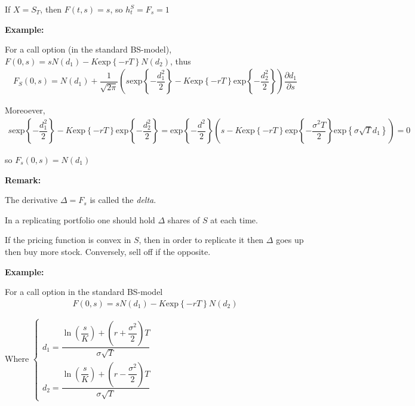 \noindent If $X = S_T$, then $F(t,s) = s$, so $h_t^S = F_s = 1$
\par\bigskip
\noindent\textbf{Example:}\par
\noindent For a call option (in the standard BS-model), $F(0,s) = sN(d_1) - K\text{exp}\left\{-rT\right\}N(d_2)$, thus
\begin{equation*}
  \begin{gathered}
    F_S(0,s) = N(d_1)+\dfrac{1}{\sqrt{2\pi}}\left(s\text{exp}\left\{-\dfrac{d_1^2}{2}\right\}-K\text{exp}\left\{-rT\right\}\text{exp}\left\{-\dfrac{d_2^2}{2}\right\}\right)\dfrac{\partial d_1}{\partial s}
  \end{gathered}
\end{equation*}
\par\bigskip
\noindent Moreoever, 
\begin{equation*}
  \begin{gathered}
    s\text{exp}\left\{-\dfrac{d_1^2}{2}\right\}-K\text{exp}\left\{-rT\right\}\text{exp}\left\{-\dfrac{d_2^2}{2}\right\} = \text{exp}\left\{-\dfrac{d^2}{2}\right\}\left(s-K\text{exp}\left\{-rT\right\}\text{exp}\left\{-\dfrac{\sigma^2T}{2}\right\}\text{exp}\left\{\sigma\sqrt{T}d_1\right\}\right) = 0
  \end{gathered}
\end{equation*}\par
\noindent so $F_s(0,s) = N(d_1)$
\par\bigskip
\noindent\textbf{Remark:}\par
\noindent The derivative $\Delta = F_s$ is called the \textit{delta}.\par
\noindent In a replicating portfolio one should hold $\Delta$ shares of $S$ at each time.
\par\bigskip
\noindent If the pricing function is convex in $S$, then in order to replicate it then $\Delta$ goes up then buy more stock. Conversely, sell off if the opposite.
\par\bigskip
\noindent\textbf{Example:}\par
\noindent For a call option in the standard BS-model
\begin{equation*}
  \begin{gathered}
    F(0,s) = sN(d_1)-K\text{exp}\left\{-rT\right\}N(d_2)
  \end{gathered}
\end{equation*}\par
\noindent Where $\begin{cases}
  d_1 = \dfrac{\ln{\left(\dfrac{s}{K}\right)}+(r+\dfrac{\sigma^2}{2})T}{\sigma\sqrt{T}}\\d_2 = \dfrac{\ln{\left(\dfrac{s}{K}\right)}+(r-\dfrac{\sigma^2}{2})T}{\sigma\sqrt{T}}
\end{cases}$\par
